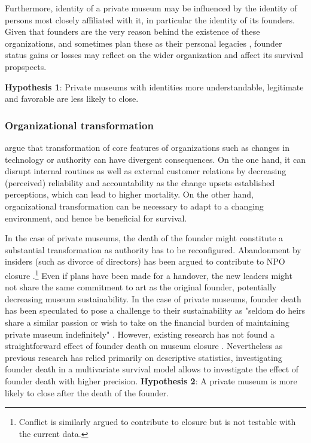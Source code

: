 \documentclass[12pt]{article}
\begin{document}
Furthermore, identity of a private museum may be influenced by the identity of persons most closely affiliated with it, in particular the identity of its founders.
Given that founders are the very reason behind the existence of these organizations, and sometimes plan these as their personal legacies \parencite{Walker_2019_collector}, founder status gains or losses may reflect on the wider organization and affect its survival propspects.


\bigbreak
\noindent
\textbf{Hypothesis 1}: Private museums with identities more understandable, legitimate and favorable are less likely to close. 



\subsubsection*{Organizational transformation}

\textcite{Carroll_Khessina_2019_demography} argue that transformation of core features of organizations such as changes in technology or authority can have divergent consequences. 
On the one hand, it can disrupt internal routines as well as external customer relations by decreasing (perceived) reliability and accountability as the change upsets established perceptions, which can lead to higher mortality. 
On the other hand, organizational transformation can be necessary to adapt to a changing environment, and hence be beneficial for survival.



In the case of private museums, the death of the founder might constitute a substantial transformation as authority has to be reconfigured.
Abandonment by insiders (such as divorce of directors) has been argued to contribute to NPO closure \parencite{Duckles_Hager_Galaskiewicz_2005_close}.\footnote{Conflict is similarly argued to contribute to closure but is not testable with the current data.}
Even if plans have been made for a handover, the new leaders might not share the same commitment to art as the original founder, potentially decreasing museum sustainability. 
In the case of private museums, founder death has been speculated to pose a challenge to their sustainability as "seldom do heirs share a similar passion or wish to take on the financial burden of maintaining private museum indefinitely" \parencite[p.234]{Walker_2019_collector}.
However, existing research has not found a straightforward effect of founder death on museum closure \parencite{Velthuis_Gera_forthcoming_fragility,Velthuis_etal_2023_boom}.
Nevertheless as previous research has relied primarily on descriptive statistics, investigating founder death in a multivariate survival model allows to investigate the effect of founder death with higher precision.
\bigbreak
\noindent
\textbf{Hypothesis 2}: A private museum is more likely to close after the death of the founder.
\end{document}

